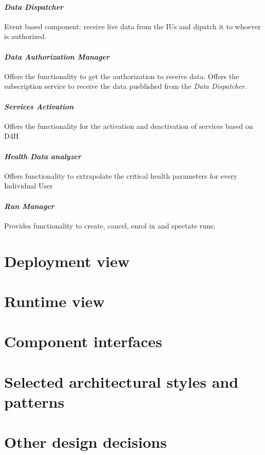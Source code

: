 \paragraph{\textit{Data Dispatcher}} Event based component: receive live data from the IUs and dipatch it to whoever is authorized.
\paragraph{\textit{Data Authorization Manager}} Offers the functionality to get the authorization to receive data. Offers the subscription service to receive the data pusblished from the \textit{Data Dispatcher}.
\paragraph{\textit{Services Activation}} Offers the functionality for the activation and deactivation of services based on D4H
\paragraph{\textit{Health Data analyzer}} Offers functionality to extrapolate the critical health parameters for every Individual User
\paragraph{\textit{Run Manager}} Provides functionality to create, cancel, enrol in and spectate runs; 
\section{Deployment view}
\section{Runtime view}
\section{Component interfaces}
\section{Selected architectural styles and patterns}
\section{Other design decisions}
